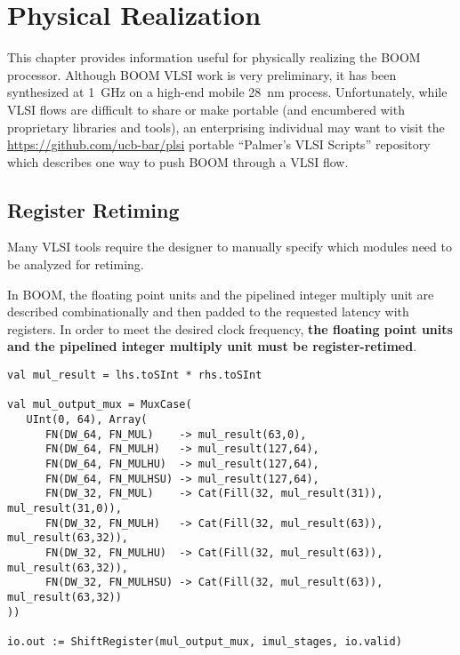 \chapter{Physical Realization}\label{chapter:physical}

This chapter provides information useful for physically realizing the BOOM processor.  Although BOOM VLSI work is very preliminary, it has been synthesized at 1~GHz on a high-end mobile 28~nm process. Unfortunately, while VLSI flows are difficult to share or make portable (and encumbered with proprietary libraries and tools), an enterprising individual may want to visit the \url{https://github.com/ucb-bar/plsi} portable ``Palmer's VLSI Scripts'' repository which describes one way to push BOOM through a VLSI flow.

\section{Register Retiming}
 
Many VLSI tools require the designer to manually specify which modules need to
be analyzed for retiming. 
                 
In BOOM, the floating point units and the pipelined integer multiply unit are
described combinationally and then padded to the requested latency with
registers.
In order to meet the desired clock frequency,  {\bf the floating point units and the
pipelined integer multiply unit must be register-retimed}.
 
\begin{center}
\begin{minipage}{0.90\textwidth}
\begin{lstlisting}[caption=Pipelined integer multiply unit requires register retiming to be realized properly.]
val mul_result = lhs.toSInt * rhs.toSInt
                                                                               
val mul_output_mux = MuxCase(                                                  
   UInt(0, 64), Array(                                                         
      FN(DW_64, FN_MUL)    -> mul_result(63,0),                                
      FN(DW_64, FN_MULH)   -> mul_result(127,64),                              
      FN(DW_64, FN_MULHU)  -> mul_result(127,64),                              
      FN(DW_64, FN_MULHSU) -> mul_result(127,64),                              
      FN(DW_32, FN_MUL)    -> Cat(Fill(32, mul_result(31)), mul_result(31,0)), 
      FN(DW_32, FN_MULH)   -> Cat(Fill(32, mul_result(63)), mul_result(63,32)),
      FN(DW_32, FN_MULHU)  -> Cat(Fill(32, mul_result(63)), mul_result(63,32)),
      FN(DW_32, FN_MULHSU) -> Cat(Fill(32, mul_result(63)), mul_result(63,32)) 
))                                                                             
                                                                               
io.out := ShiftRegister(mul_output_mux, imul_stages, io.valid)
\end{lstlisting}\label{code:imul}
\end{minipage}
\end{center}

